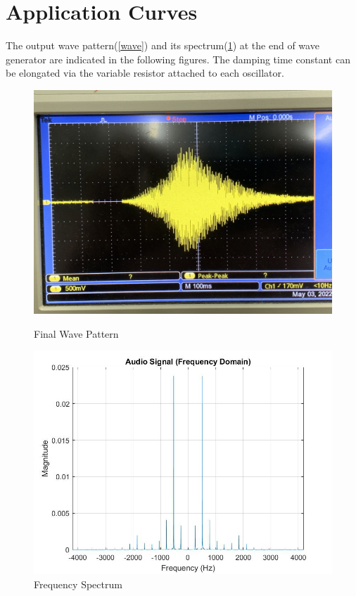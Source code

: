 \documentclass[a4paper,12pt,oneside,pdflatex,italian,final,twocolumn]{article}
\begin{document}
\section{Application Curves}
\vspace{-.2cm}
The output wave pattern(\ref{wave}) and its spectrum(\ref{spectrum}) at the end of wave generator are indicated in the following figures. The damping time constant can be elongated via the variable resistor attached to each oscillator.
\begin{figure}[h]
    \begin{minipage}{0.47\textwidth}
        \centering
        \includegraphics[width=.65\textwidth]{final_wave}
        \caption{Final Wave Pattern}
        \label{wave}
    \end{minipage}
        \hfill
        \begin{minipage}{0.47\textwidth}
        \centering
        \includegraphics[width=.65\textwidth]{spectrum_c}
        \caption{Frequency Spectrum}
        \label{spectrum}
    \end{minipage}
\end{figure}
\end{document}
